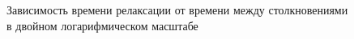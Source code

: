 \documentclass[12pt,oneside]{book}
\begin{document}
{{\begin{figure}[h!]
		\caption{Зависимость времени релаксации от времени между столкновениями в двойном логарифмическом масштабе}
		\label{fig:f4}
	\end{figure}


}}
\end{document}
